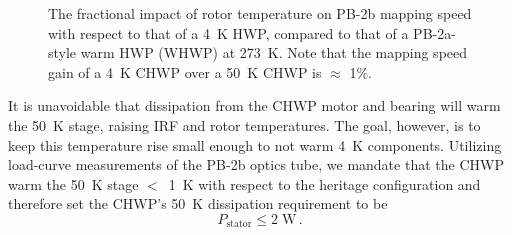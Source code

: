 \begin{figure}[!t]
    \centering
    \caption{The fractional impact of rotor temperature on PB-2b mapping speed with respect to that of a 4~K HWP, compared to that of a PB-2a-style warm HWP (WHWP) at 273~K.\cite{hill_design_2016} Note that the mapping speed gain of a 4~K CHWP over a 50~K CHWP is $\approx$ 1\%.}
\label{fig:mapping_speed} 
\end{figure}

It is unavoidable that dissipation from the CHWP motor and bearing will warm the 50~K stage, raising IRF and rotor temperatures. The goal, however, is to keep this temperature rise small enough to not warm 4~K components. Utilizing load-curve measurements of the PB-2b optics tube,\cite{howe_polarbear-2_2019} we mandate that the CHWP warm the 50~K stage $<$~1~K with respect to the heritage configuration and therefore set the CHWP's 50~K dissipation requirement to be
\begin{equation}
    P_{\mathrm{stator}} \leq 2 \; \mathrm{W} \, .
    \label{eq:stator_power}
\end{equation}

